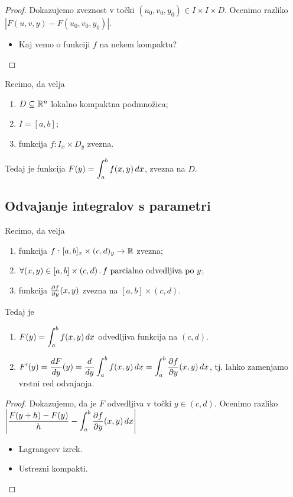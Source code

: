 \begin{proof}
    Dokazujemo zveznost v točki $(u_0, v_0, y_0) \in I \times I \times D$. Ocenimo razliko $|F(u,v,y) - F(u_0, v_0, y_0)|$.
    \begin{itemize}
        \item  Kaj vemo o funkciji $f$ na nekem kompaktu? \qedhere
    \end{itemize}
\end{proof}

\begin{posledica}
    Recimo, da velja
    \begin{enumerate}
        \item $D \subseteq \mathbb{R}^n$ lokalno kompaktna podmnožica;
        \item $I = [a,b]$;
        \item funkcija $f: I_x \times D_y$ zvezna.
    \end{enumerate}
    Tedaj je funkcija $\displaystyle F(y) = \int_{a}^{b}f(x,y) \, dx$, zvezna na $D$.
\end{posledica}

\subsection{Odvajanje integralov s parametri}
\begin{trditev}
    Recimo, da velja
    \begin{enumerate}
        \item funkcija $f:[a,b]_x \times (c,d)_y \to \mathbb{R}$ zvezna;
        \item $\forall (x,y) \in [a,b] \times (c,d) \,.\, f \text{ parcialno odvedljiva po } y$;
        \item funkcija $\frac{\partial f}{\partial y}(x,y)$ zvezna na $[a,b] \times (c,d)$.
    \end{enumerate}
    Tedaj je 
    \begin{enumerate}
        \item $\displaystyle F(y) = \int_{a}^{b}f(x,y) \, dx$ odvedljiva funkcija na $(c,d)$.
        \item $\displaystyle F'(y) = \frac{dF}{dy}(y) = \frac{d}{dy} \int_{a}^{b}f(x,y) \, dx = \int_{a}^{b} \frac{\partial f}{\partial y}(x,y) \, dx$, tj. lahko zamenjamo vrstni red odvajanja.
    \end{enumerate}    
\end{trditev}

\begin{proof}
    Dokazujemo, da je $F$ odvedljiva v točki $y \in (c,d)$. Ocenimo razliko $\displaystyle \left|\frac{F(y+h)-F(y)}{h} - \int_{a}^{b} \frac{\partial f}{\partial y}(x,y) \,dx \right|$
    \begin{itemize}
        \item Lagrangeev izrek.
        \item Ustrezni kompakti. \qedhere
    \end{itemize}
\end{proof}

